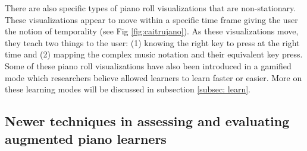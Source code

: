 \documentclass[sigchi, review]{acmart}
\begin{document}
There are also specific types of piano roll visualizations that are non-stationary. These visualizations appear to move within a specific time frame giving the user the notion of temporality (see Fig \ref{fig:caitrujano}). As these visualizations move, they teach two things to the user: (1) knowing the right key to press at the right time and (2) mapping the complex music notation and their equivalent key press. Some of these piano roll visualizations have also been introduced in a gamified mode \cite{Weing:2013:PEI:2494091.2494113} which researchers believe allowed learners to learn faster or easier. More on these learning modes will be discussed in subsection \ref{subsec: learn}. 




\subsection{Newer techniques in assessing and evaluating augmented piano learners}
\label{subsec: eval}
\end{document}
